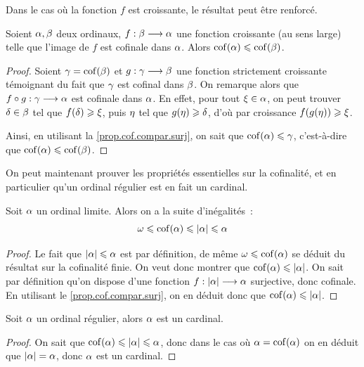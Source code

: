 \noindent
Dans le cas où la fonction $f$ est croissante, le résultat peut être renforcé.

\begin{proposition}
  Soient $\alpha,\beta$ deux ordinaux, $f : \displaystyle \beta \longrightarrow \alpha$ une
  fonction croissante (au sens large) telle que l'image de $f$ est cofinale dans
  $\alpha$. Alors $\operatorname{cof}(\alpha)\leqslant\operatorname{cof}(\beta)$.
\end{proposition}

\begin{proof}
  Soient $\gamma = \operatorname{cof}(\beta)$ et $g : \displaystyle \gamma \longrightarrow \beta$ une
  fonction strictement croissante témoignant du fait que $\gamma$ est cofinal
  dans $\beta$.
  On remarque alors que $f\circ g : \displaystyle \gamma \longrightarrow \alpha$ est cofinale
  dans $\alpha$.
  En effet, pour tout $\xi \in \alpha$, on peut trouver $\delta \in \beta$
  tel que $f(\delta) \geqslant \xi$, puis $\eta$ tel que $g(\eta) \geqslant\delta$,
  d'où par croissance $f(g(\eta)) \geqslant \xi$.
  
  Ainsi, en utilisant la \cref{prop.cof.compar.surj}, on sait que
  $\operatorname{cof}(\alpha)\leqslant \gamma$, c'est-à-dire que $\operatorname{cof}(\alpha)\leqslant\operatorname{cof}(\beta)$.
\end{proof}

On peut maintenant prouver les propriétés essentielles sur la cofinalité, et en
particulier qu'un ordinal régulier est en fait un cardinal.

\begin{proposition}
  Soit $\alpha$ un ordinal limite. Alors on a la suite d'inégalités~:
  \[\omega\leqslant \operatorname{cof}(\alpha) \leqslant |\alpha|\leqslant \alpha\]
\end{proposition}

\begin{proof}
  Le fait que $|\alpha|\leqslant \alpha$ est par définition, de même
  $\omega\leqslant\operatorname{cof}(\alpha)$ se déduit du résultat sur la cofinalité finie. On
  veut donc montrer que $\operatorname{cof}(\alpha) \leqslant|\alpha|$. On sait par définition
  qu'on dispose d'une fonction $f : \displaystyle |\alpha| \longrightarrow \alpha$ surjective,
  donc cofinale. En utilisant le \cref{prop.cof.compar.surj}, on en déduit donc
  que $\operatorname{cof}(\alpha)\leqslant|\alpha|$.
\end{proof}

\begin{property}
  Soit $\alpha$ un ordinal régulier, alors $\alpha$ est un cardinal.
\end{property}

\begin{proof}
  On sait que $\operatorname{cof}(\alpha) \leqslant |\alpha| \leqslant \alpha$, donc dans le cas où
  $\alpha = \operatorname{cof}(\alpha)$ on en déduit que $|\alpha| = \alpha$, donc $\alpha$
  est un cardinal.
\end{proof}

